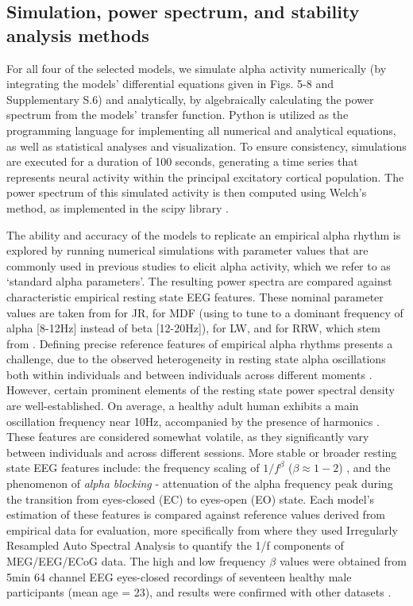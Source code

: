 \documentclass[12pt,twoside]{article}
\begin{document}
\subsection{Simulation, power spectrum, and stability analysis methods}
For all four of the selected models, we simulate alpha activity numerically (by integrating the models' differential equations given in Figs. 5-8 and Supplementary S.6) and analytically, by algebraically calculating the power spectrum from the models' transfer function. Python is utilized as the programming language for implementing all numerical and analytical equations, as well as statistical analyses and visualization. To ensure consistency, simulations are executed for a duration of 100 seconds, generating a time series that represents neural activity within the principal excitatory cortical population. The power spectrum of this simulated activity is then computed using Welch's method, as implemented in the scipy library \citep{2020SciPy-NMeth}. 

The ability and accuracy of the models to replicate an empirical alpha rhythm is explored by running numerical simulations with parameter values that are commonly used in previous studies to elicit alpha activity, which we refer to as `standard alpha parameters'. The resulting power spectra are compared against characteristic empirical resting state EEG features. These nominal parameter values are taken from \citet{jansen1995electroencephalogram} for JR, \citet{moran2007neural} for MDF (using \citet{david2003neural} to tune to a dominant frequency of alpha [8-12Hz] instead of beta [12-20Hz]), \citet{liley2001spatially} for LW, and \citet{zhao2015generalized} for RRW, which stem from \citet{robinson2002dynamics, rowe2004estimation}. Defining precise reference features of empirical alpha rhythms presents a challenge, due to the observed heterogeneity in resting state alpha oscillations both within individuals and between individuals across different moments \citep{niedermeyer2005normal}. However, certain prominent elements of the resting state power spectral density are well-established. On average, a healthy adult human exhibits a main oscillation frequency near 10Hz, accompanied by the presence of harmonics \citep{van2010neurophysiological}. These features are considered somewhat volatile, as they significantly vary between individuals and across different sessions. More stable or broader resting state EEG features include: the frequency scaling of $1/f^{\beta}$ ($\beta \approx 1 - 2$) \citep{muthukumaraswamy20181}, and the phenomenon of \textit{alpha blocking} - attenuation of the alpha frequency peak during the transition from eyes-closed (EC) to eyes-open (EO) state. Each model's estimation of these features is compared against reference values derived from empirical data for evaluation, more specifically from \citet{muthukumaraswamy20181} where they used Irregularly Resampled Auto Spectral Analysis to quantify the 1/f components of MEG/EEG/ECoG data. The high and low frequency $\beta$ values were obtained from 5min 64 channel EEG eyes-closed recordings of seventeen healthy male participants (mean age = 23), and results were confirmed with other datasets \citep{muthukumaraswamy20181}. 
\end{document}
